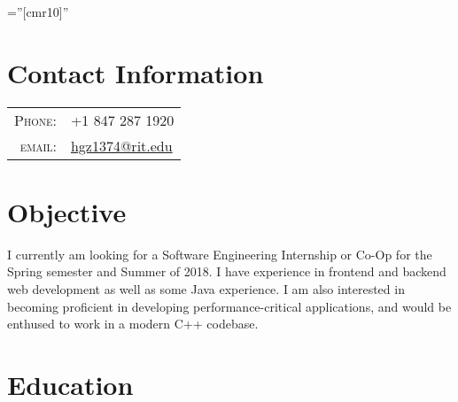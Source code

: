 \documentclass[a4paper,10pt]{article} %
\begin{document}
\pagestyle{empty} %

\font\fb=''[cmr10]'' %

\setlength{\voffset}{-0.55in}

\par{\par{}} %

\section{Contact Information}

\begin{tabular}{rl}
\textsc{Phone:} & +1 847 287 1920\\
\textsc{email:} & \href{mailto:hgz1374@rit.edu}{hgz1374@rit.edu}
\end{tabular}

\section{Objective}
    I currently am looking for a Software Engineering Internship or Co-Op for the Spring semester and Summer of 2018.
    I have experience in frontend and backend web development as well as some Java experience.
    I am also interested in becoming proficient in developing performance-critical applications, and would be enthused to work in a modern C++ codebase.


\section{Education}
\end{document}
